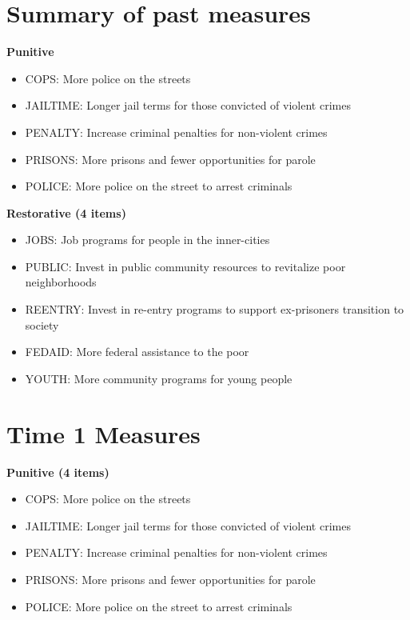 \documentclass[
]{book}
\providecommand{\tightlist}{%
  \setlength{\itemsep}{0pt}\setlength{\parskip}{0pt}}
\begin{document}
\hypertarget{summary-of-past-measures}{%
\section{Summary of past measures}\label{summary-of-past-measures}}

\textbf{Punitive}

\begin{itemize}
\tightlist
\item
  COPS: More police on the streets
\item
  JAILTIME: Longer jail terms for those convicted of violent crimes
\item
  PENALTY: Increase criminal penalties for non-violent crimes
\item
  PRISONS: More prisons and fewer opportunities for parole
\item
  POLICE: More police on the street to arrest criminals
\end{itemize}

\textbf{Restorative (4 items)}

\begin{itemize}
\tightlist
\item
  JOBS: Job programs for people in the inner-cities
\item
  PUBLIC: Invest in public community resources to revitalize poor neighborhoods
\item
  REENTRY: Invest in re-entry programs to support ex-prisoners transition to society
\item
  FEDAID: More federal assistance to the poor
\item
  YOUTH: More community programs for young people
\end{itemize}

\hypertarget{time-1-measures}{%
\section{Time 1 Measures}\label{time-1-measures}}

\textbf{Punitive (4 items)}

\begin{itemize}
\tightlist
\item
  COPS: More police on the streets
\item
  JAILTIME: Longer jail terms for those convicted of violent crimes
\item
  PENALTY: Increase criminal penalties for non-violent crimes
\item
  PRISONS: More prisons and fewer opportunities for parole
\item
  POLICE: More police on the street to arrest criminals
\end{itemize}
\end{document}
